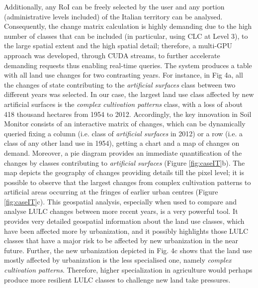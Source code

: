 \documentclass[APA,LATO1COL,doublespace]{WileyNJD-v2}
\begin{document}
Additionally, any RoI can be freely selected by the user and any portion (administrative levels included) of the Italian territory can be analysed. Consequently, the change matrix calculation is highly demanding due to the high number of classes that can be included (in particular, using CLC at Level 3), to the large spatial extent and the high spatial detail; therefore, a multi-GPU approach was developed, through CUDA streams, to further accelerate demanding requests thus enabling real-time queries. 
The system produces a table with all land use changes for two contrasting years. 
For instance, in Fig 4a, all the changes of state contributing to the \textit{artificial surfaces} class between two different years was selected. 
In our case, the largest land use class affected by new artificial surfaces is the \textit{complex cultivation patterns} class, with a loss of about 418 thousand hectares from 1954 to 2012. 
Accordingly, the key innovation in Soil Monitor consists of an interactive matrix of changes, which can be dynamically queried fixing a column (i.e. class of \textit{artificial surfaces} in 2012) or a row (i.e. a class of any other land use in 1954), getting a chart and a map of changes on demand. 
Moreover, a pie diagram provides an immediate quantification of the changes by classes contributing to \textit{artificial surfaces} (Figure \ref{fig:caseIT}b). 
The map depicts the geography of changes providing details till the pixel level; it is possible to observe that the largest changes from complex cultivation patterns to artificial areas occurring at the fringes of earlier urban centres (Figure \ref{fig:caseIT}c). 
This geospatial analysis, especially when used to compare and analyse LULC changes between more recent years, is a very powerful tool. 
It provides very detailed geospatial information about the land use classes, which have been affected more by urbanization, and it possibly highlights those LULC classes that have a major risk to be affected by new urbanization in the near future. 
Further, the new urbanization depicted in Fig. 4c shows that the land use mostly affected by urbanization is the less specialised one, namely \textit{complex cultivation patterns}. 
Therefore, higher specialization in agriculture would perhaps produce more resilient LULC classes to challenge new land take pressures.
\end{document}

